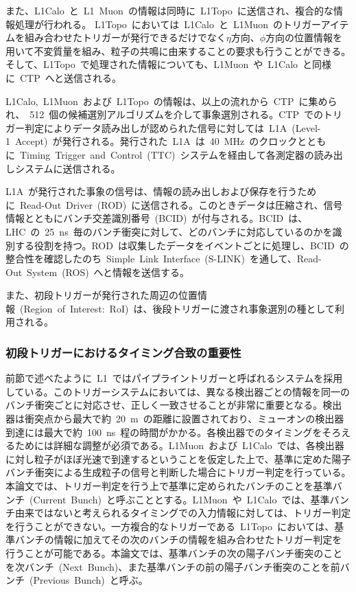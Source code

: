 また、L1Calo~と~L1~Muon~の情報は同時に~L1Topo~に送信され、複合的な情報処理が行われる。
L1Topo~においては~L1Calo~と~L1Muon~のトリガーアイテムを組み合わせたトリガーが発行できるだけでなく$\eta$方向、$\phi$方向の位置情報を用いて不変質量を組み、粒子の共鳴に由来することの要求も行うことができる。そして、L1Topo~で処理された情報についても、L1Muon~や~L1Calo~と同様に~CTP~へと送信される。

L1Calo,~L1Muon~および~L1Topo~の情報は、以上の流れから~CTP~に集められ、~512~個の候補選別アルゴリズムを介して事象選別される。CTP~でのトリガー判定によりデータ読み出しが認められた信号に対しては~L1A~(Level-1~Accept)~が発行される。発行された~L1A~は~40~MHz~のクロックとともに~Timing~Trigger~and~Control~(TTC)~システムを経由して各測定器の読み出しシステムに送信される。

L1A~が発行された事象の信号は、情報の読み出しおよび保存を行うために~Read-Out~Driver~(ROD)~に送信される。このときデータは圧縮され、信号情報とともにバンチ交差識別番号~(BCID)~が付与される。BCID~は、LHC~の~25~ns~毎のバンチ衝突に対して、どのバンチに対応しているのかを識別する役割を持つ。ROD~は収集したデータをイベントごとに処理し、BCID~の整合性を確認したのち~Simple~Link~Interface~(S-LINK)~\cite{URL:20}を通して、Read-Out~System~(ROS)~へと情報を送信する。

また、初段トリガーが発行された周辺の位置情報~(Region~of~Interest:~RoI)~は、後段トリガーに渡され事象選別の種として利用される。

\subsubsection{初段トリガーにおけるタイミング合致の重要性}
前節で述べたように~L1~ではパイプライントリガーと呼ばれるシステムを採用している。このトリガーシステムにおいては、異なる検出器ごとの情報を同一のバンチ衝突ごとに対応させ、正しく一致させることが非常に重要となる。検出器は衝突点から最大で約~20~m~の距離に設置されており、ミューオンの検出器到達には最大で約~100~ns~程の時間がかかる。各検出器でのタイミングをそろえるためには詳細な調整が必須である。L1Muon~および~L1Calo~では、各検出器に対し粒子がほぼ光速で到達するということを仮定した上で、基準に定めた陽子バンチ衝突による生成粒子の信号と判断した場合にトリガー判定を行っている。本論文では、トリガー判定を行う上で基準に定められたバンチのことを基準バンチ~(Current~Bunch)~と呼ぶこととする。L1Muon~や~L1Calo~では、基準バンチ由来ではないと考えられるタイミングでの入力情報に対しては、トリガー判定を行うことができない。一方複合的なトリガーである~L1Topo~においては、基準バンチの情報に加えてその次のバンチの情報を組み合わせたトリガー判定を行うことが可能である。本論文では、基準バンチの次の陽子バンチ衝突のことを次バンチ~(Next~Bunch)、また基準バンチの前の陽子バンチ衝突のことを前バンチ~(Previous~Bunch)~と呼ぶ。

